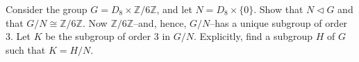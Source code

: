\documentclass[12pt,letterpaper,boxed]{hmcpset}
\begin{document}
\begin{solution}
\end{solution}

\clearpage

\begin{problem}[11.3.8]
Consider the group $G = D_8 \times \mathbb{Z}/6\mathbb{Z}$, and let $N = D_8 \times \{0\}$. Show that $N \triangleleft G$ and that $G/N \cong \mathbb{Z}/6\mathbb{Z}$. Now $\mathbb{Z}/6\mathbb{Z}$--and, hence, $G/N$--has a unique subgroup of order 3. Let $K$ be the subgroup of order 3 in $G/N$. Explicitly, find a subgroup $H$ of $G$ such that $K = H/N$.
\end{problem}

\begin{solution}

\end{solution}
\end{document}
